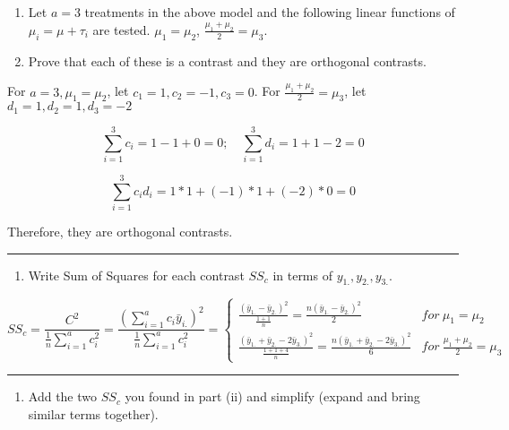 \documentclass[]{article}
\providecommand{\tightlist}{%
  \setlength{\itemsep}{0pt}\setlength{\parskip}{0pt}}
\begin{document}
\begin{enumerate}
\def\labelenumi{(\alph{enumi})}
\setcounter{enumi}{2}
\item
  Let \(a=3\) treatments in the above model and the following linear
  functions of \(\mu_i=\mu+\tau_i\) are tested. \(\mu_1=\mu_2\),
  \(\frac{\mu_1+\mu_2}{2}=\mu_3\).
\item
  Prove that each of these is a contrast and they are orthogonal
  contrasts.
\end{enumerate}

For \(a=3,\mu_1=\mu_2\), let \(c_1=1,c_2=-1,c_3=0\). For
\(\frac{\mu_1+\mu_2}2=\mu_3\), let \(d_1=1,d_2=1,d_3=-2\)

\[\sum_{i=1}^3c_i=1-1+0=0;\quad\sum_{i=1}^3d_i=1+1-2=0\]

\[\sum_{i=1}^3c_id_i=1*1+(-1)*1+(-2)*0=0\]

Therefore, they are orthogonal contrasts.

\begin{center}\rule{0.5\linewidth}{\linethickness}\end{center}

\begin{enumerate}
\def\labelenumi{(\roman{enumi})}
\setcounter{enumi}{1}
\tightlist
\item
  Write Sum of Squares for each contrast \(SS_c\) in terms of
  \(y_{1.},y_{2.},y_{3.}\).
\end{enumerate}

\[SS_c=\frac{C^2}{\frac1n\sum_{i=1}^ac_i^2}=\frac{(\sum_{i=1}^ac_i\bar y_{i.})^2}{\frac1n\sum_{i=1}^ac_i^2}=\begin{cases}\frac{(\bar y_{1.}-\bar y_{2.})^2}{\frac{1+1}n}=\frac{n(\bar y_{1.}-\bar y_{2.})^2}{2}
&for\ \mu_1=\mu_2\\
\frac{(\bar y_{1.}+\bar y_{2.}-2\bar y_{3.})^2}{\frac{1+1+4}n}=\frac{n(\bar y_{1.}+\bar y_{2.}-2\bar y_{3.})^2}{6}
&for\ \frac{\mu_1+\mu_2}{2}=\mu_3
\end{cases}\]

\begin{center}\rule{0.5\linewidth}{\linethickness}\end{center}

\begin{enumerate}
\def\labelenumi{(\roman{enumi})}
\setcounter{enumi}{2}
\tightlist
\item
  Add the two \(SS_c\) you found in part (ii) and simplify (expand and
  bring similar terms together).
\end{enumerate}
\end{document}
